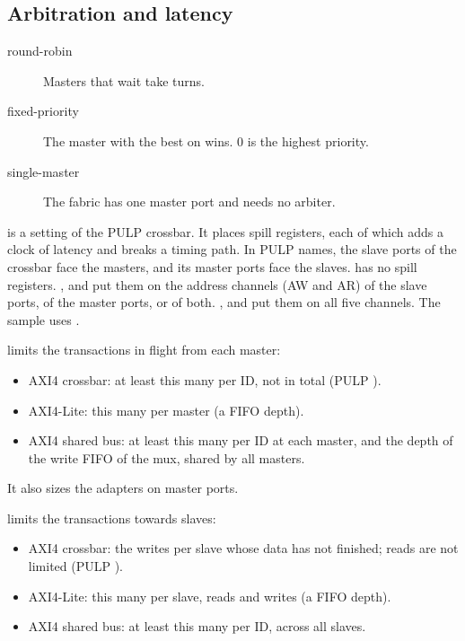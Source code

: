 \subsection{Arbitration and latency}

\begin{description}
\item[round-robin] Masters that wait take turns.
\item[fixed-priority] The master with the best  on  wins.
  0 is the highest priority.
\item[single-master] The fabric has one master port and needs no arbiter.
\end{description}

 is a setting of the PULP crossbar. It places spill registers, each
of which adds a clock of latency and breaks a timing path. In PULP names, the slave
ports of the crossbar face the masters, and its master ports face the slaves.
 has no spill registers. ,  and
 put them on the address channels (AW and AR) of the slave ports, of
the master ports, or of both. ,  and
 put them on all five channels. The sample uses .

 limits the transactions in flight from each master:

\begin{itemize}
\item AXI4 crossbar: at least this many per ID, not in total (PULP ).
\item AXI4-Lite: this many per master (a FIFO depth).
\item AXI4 shared bus: at least this many per ID at each master, and the depth of the
  write FIFO of the mux, shared by all masters.
\end{itemize}

It also sizes the adapters on master ports.

 limits the transactions towards slaves:

\begin{itemize}
\item AXI4 crossbar: the writes per slave whose data has not finished; reads are not
  limited (PULP ).
\item AXI4-Lite: this many per slave, reads and writes (a FIFO depth).
\item AXI4 shared bus: at least this many per ID, across all slaves.
\end{itemize}

